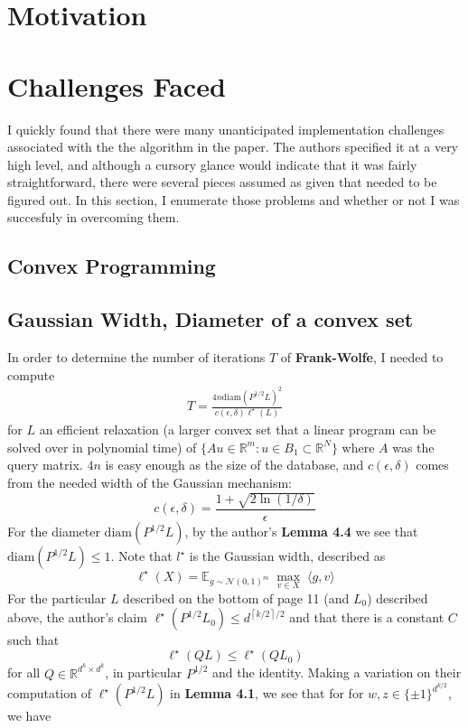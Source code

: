 \section{Motivation}

\section{Challenges Faced}
I quickly found that there were many unanticipated implementation challenges
associated with the the algorithm in the paper. The authors specified it
at a very high level, and although a cursory glance would indicate that it
was fairly straightforward, there were several pieces assumed as given that
needed to be figured out. In this section, I enumerate those problems 
and whether or not I was succesfuly in overcoming them.
\subsection{Convex Programming}


\subsection{Gaussian Width, Diameter of a convex set}
In order to determine the number of iterations $T$ of {\bf Frank-Wolfe},
I needed to compute
\begin{align}
T = \frac{4n \mathrm{diam}(P^{1/2}L)^2}{c(\epsilon, \delta) \ell^\star(L)}
\end{align}
for $L$ an efficient relaxation (a larger convex set that a linear program
can be solved over in polynomial time) of
$\{Au \in \mathbb R^m : u \in B_1 \subset \mathbb R^N\}$ where $A$ was the
query matrix. $4n$ is easy enough as the size of the database, and $c(\epsilon,
\delta)$ comes from the needed width of the Gaussian mechanism:
\[ c(\epsilon, \delta) = \frac{1 + \sqrt{2 \ln(1/\delta)}}\epsilon \]
For the diameter $\mathrm{diam}(P^{1/2}L)$, by the author's {\bf Lemma 4.4}
we see that $\mathrm{diam}(P^{1/2}L) \leq 1$. 
Note that $l^\star$ is the Gaussian width, described as
\[ \ell^\star(X) = \mathbb E_{g \sim \mathcal N(0, 1)^m} \; \max_{v \in X} \;
        \langle g, v \rangle \]
For the particular $L$ described on the bottom of page 11 (and $L_0$) described
above, the author's claim $\ell^\star(P^{1/2}L_0) \leq
    d^{\left \lceil k/2 \right \rceil/2}$ and that there is a constant
$C$ such that \[\ell^\star(QL) \leq \ell^\star(QL_0)\] for all
$Q \in \mathbb R^{d^k \times d^k}$, in particular $P^{1/2}$ and the identity.
Making a variation on their computation of $\ell^\star(P^{1/2}L)$ in 
{\bf Lemma 4.1}, we see that for for $w, z \in \{\pm 1\}^{d^{k/2}}$, we have

